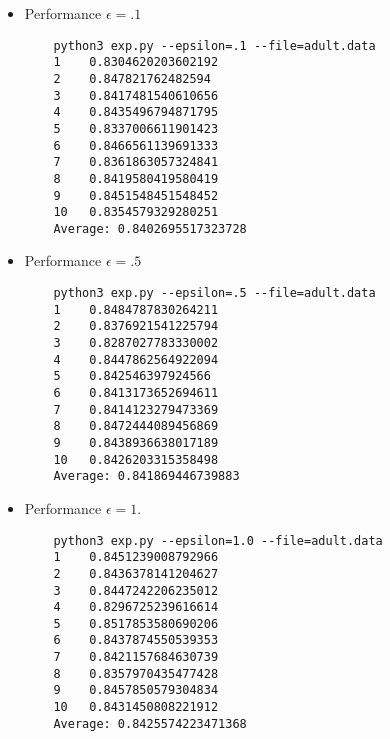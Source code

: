 \documentclass{article}
\begin{document}
\begin{itemize}
	\item Performance $\epsilon = .1$
	\begin{verbatim}
	python3 exp.py --epsilon=.1 --file=adult.data
	1 	 0.8304620203602192
	2 	 0.847821762482594
	3 	 0.8417481540610656
	4 	 0.8435496794871795
	5 	 0.8337006611901423
	6 	 0.8466561139691333
	7 	 0.8361863057324841
	8 	 0.8419580419580419
	9 	 0.8451548451548452
	10 	 0.8354579329280251
	Average: 0.8402695517323728
	\end{verbatim}
	\item Performance $\epsilon = .5$
	\begin{verbatim}
	python3 exp.py --epsilon=.5 --file=adult.data
	1 	 0.8484787830264211
	2 	 0.8376921541225794
	3 	 0.8287027783330002
	4 	 0.8447862564922094
	5 	 0.842546397924566
	6 	 0.8413173652694611
	7 	 0.8414123279473369
	8 	 0.8472444089456869
	9 	 0.8438936638017189
	10 	 0.8426203315358498
	Average: 0.841869446739883
	\end{verbatim}
	\item Performance $\epsilon = 1.$
	\begin{verbatim}
	python3 exp.py --epsilon=1.0 --file=adult.data
	1 	 0.8451239008792966
	2 	 0.8436378141204627
	3 	 0.8447242206235012
	4 	 0.8296725239616614
	5 	 0.8517853580690206
	6 	 0.8437874550539353
	7 	 0.8421157684630739
	8 	 0.8357970435477428
	9 	 0.8457850579304834
	10 	 0.8431450808221912
	Average: 0.8425574223471368
	\end{verbatim}
\end{itemize}
\end{document}
